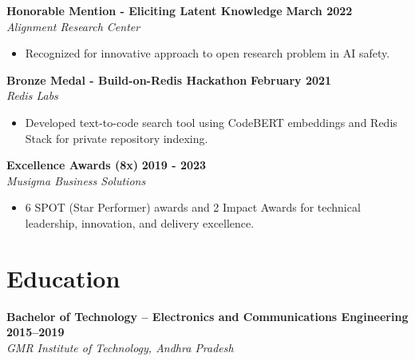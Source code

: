 \documentclass[11pt]{article}
\begin{document}
\textbf{Honorable Mention - Eliciting Latent Knowledge} \hfill \textbf{March 2022} \\
\textit{Alignment Research Center}
\begin{itemize}[leftmargin=*, nosep]
\item Recognized for innovative approach to open research problem in AI safety.
\end{itemize}

\textbf{Bronze Medal - Build-on-Redis Hackathon} \hfill \textbf{February 2021} \\
\textit{Redis Labs}
\begin{itemize}[leftmargin=*, nosep]
\item Developed text-to-code search tool using CodeBERT embeddings and Redis Stack for private repository indexing.
\end{itemize}

\textbf{Excellence Awards (8x)} \hfill \textbf{2019 - 2023} \\
\textit{Musigma Business Solutions}
\begin{itemize}[leftmargin=*, nosep]
\item 6 SPOT (Star Performer) awards and 2 Impact Awards for technical leadership, innovation, and delivery excellence.
\end{itemize}

\section{Education}

\textbf{Bachelor of Technology – Electronics and Communications Engineering} \hfill \textbf{2015–2019} \\
\textit{GMR Institute of Technology, Andhra Pradesh}
\end{document}
